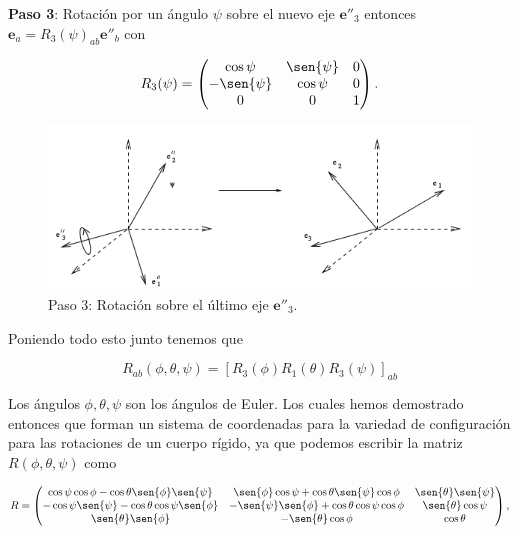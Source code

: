 \documentclass[a4paper,10pt]{article}
\numberwithin{equation}{section}
\begin{document}
\textbf{Paso 3}: Rotación por un ángulo $\psi$ sobre el nuevo eje $\mathbf{e}''_3$ 
entonces $\mathbf{e}_a = R_3(\psi)_{ab}\mathbf{e}''_b$ con 

\begin{equation}
 R_3(\psi) = \begin{pmatrix}
              \cos{\psi} & \sen{\psi} & 0 \\
	      -\sen{\psi} & \cos{\psi} & 0 \\
	      0 & 0 & 1
	     \end{pmatrix}.
\end{equation}

\begin{figure}[H]
  \center 
  \includegraphics[scale=0.66]{problema5fig4}
  \caption{Paso 3: Rotación sobre el último eje $\mathbf{e}''_3$.}
\end{figure}


Poniendo todo esto junto tenemos que 

\begin{equation}
 R_{ab} (\phi,\theta,\psi) = [R_3(\phi)R_1(\theta)R_3(\psi)]_{ab}
\end{equation}

Los ángulos $\phi,\theta,\psi$ son los ángulos de Euler. Los cuales hemos demostrado 
entonces que forman un sistema de coordenadas para la variedad de configuración 
para las rotaciones de un cuerpo rígido, ya que podemos escribir la matriz $R(\phi,\theta,\psi)$
como 

\begin{equation*}
 R  = \begin{pmatrix}
              \cos{\psi}\cos{\phi} - \cos{\theta}\sen{\phi}\sen{\psi} & 
              \sen{\phi}\cos{\psi} + \cos{\theta}\sen{\psi}\cos{\phi} & 
              \sen{\theta}\sen{\psi} \\
	      -\cos{\psi}\sen{\psi} - \cos{\theta}\cos{\psi}\sen{\phi} & 
	      -\sen{\psi}\sen{\phi} + \cos{\theta}\cos{\psi}\cos{\phi} & 
	      \sen{\theta}\cos{\psi} \\
	      \sen{\theta}\sen{\phi} & -\sen{\theta}\cos{\phi} & \cos{\theta}
	     \end{pmatrix},
\end{equation*}
\end{document}
